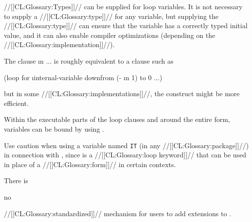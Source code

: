 \endsubSection%


//[[CL:Glossary:Types]]// can be supplied for loop variables.  
It is not necessary to supply a //[[CL:Glossary:type]]// for any variable,
but supplying the //[[CL:Glossary:type]]// 
can ensure that the variable has a correctly typed initial value,
and it can also enable compiler optimizations 
(depending on the //[[CL:Glossary:implementation]]//).
 
The clause  \i{n} ... is roughly equivalent to a clause such as 
  
\code
 (loop for \i{internal-variable} downfrom (- \i{n} 1) to 0 ...)
\endcode
                                                            
but in some //[[CL:Glossary:implementations]]//,
the  construct might be more efficient.

Within the executable parts of the loop clauses and around the entire
 form, variables can be bound by using .

Use caution when using a variable named {\tt IT} (in any //[[CL:Glossary:package]]//)
in connection with , since  is a //[[CL:Glossary:loop keyword]]// 
that can be used in place of a //[[CL:Glossary:form]]// in certain contexts.


There is

no

//[[CL:Glossary:standardized]]//
mechanism for users to add
extensions to .



\endsubSection%
